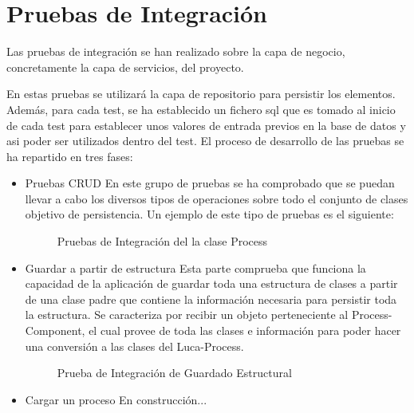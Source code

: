 \documentclass[a4paper,12pt]{book}
\begin{document}
		\section{Pruebas de Integración}
		
		Las pruebas de integración se han realizado sobre la capa de negocio, concretamente la capa de servicios, del proyecto.
		
		\vspace{5mm}
		
		En estas pruebas se utilizará la capa de repositorio para persistir los elementos. Además, para cada test, se ha establecido un fichero sql que es tomado al inicio de cada test para establecer unos valores de entrada previos en la base de datos y asi poder ser utilizados dentro del test. El proceso de desarrollo de las pruebas se ha repartido en tres fases:
		
		\begin{itemize}
			\item Pruebas CRUD
			\subitem En este grupo de pruebas se ha comprobado que se puedan llevar a cabo los diversos tipos de operaciones sobre todo el conjunto de clases objetivo de persistencia. Un ejemplo de este tipo de pruebas es el siguiente: 
			
			\begin{figure}[H]
				\centering
				\caption{Pruebas de Integración del la clase Process}\label{fig:pruebasIntegracionSimples}
			\end{figure}
			
			\item Guardar a partir de estructura
			\subitem Esta parte comprueba que funciona la capacidad de la aplicación de guardar toda una estructura de clases a partir de una clase padre que contiene la información necesaria para persistir toda la estructura. Se caracteriza por recibir un objeto perteneciente al Process-Component, el cual provee de toda las clases e información para poder hacer una conversión a las clases del Luca-Process.
			
			
			\begin{figure}[H]
				\centering
				\caption{Prueba de Integración de Guardado Estructural}\label{fig:pruebasIntegracionComplejas}
			\end{figure}
		
			\item Cargar un proceso
			\subitem En construcción...
			
		\end{itemize}
				
\end{document}
